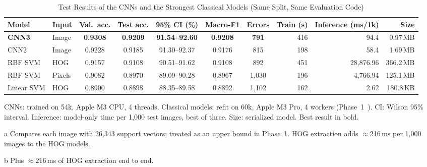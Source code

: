 \documentclass[conference]{IEEEtran}
\newcommand{\best}[1]{\textbf{#1}}
\begin{document}
\begin{table}[t]
  \centering
  \begin{threeparttable}
  \caption{Test Results of the CNNs and the Strongest Classical Models (Same Split, Same Evaluation Code)}
  \label{tab:test}
  \setlength{\tabcolsep}{5pt}
  \begin{tabular}{@{}l l c c c c c r r r@{}}
    \toprule
    Model & Input & Val.\ acc. & Test acc. & 95\% CI (\%) & Macro-F1 & Errors & Train (s) & Inference (ms/1k) & Size \\
    \midrule
    \best{CNN3} & Image & \best{0.9308} & \best{0.9209} & \best{91.54--92.60} & \best{0.9208} & \best{791} & 416 & 94.4 & 0.97\,MB \\
    CNN2        & Image & 0.9228 & 0.9185 & 91.30--92.37 & 0.9176 & 815 & 198 & 58.4 & 1.69\,MB \\
    \midrule
    RBF SVM     & HOG    & 0.9157 & 0.9108 & 90.51--91.62 & 0.9108 & 892   & 451 & 28{,}876.96\tnote{a} & 366.2\,MB \\
    RBF SVM     & Pixels & 0.9082 & 0.8970 & 89.09--90.28 & 0.8967 & 1{,}030 & 196 & 4{,}766.94 & 125.1\,MB \\
    Linear SVM  & HOG    & 0.8900 & 0.8898 & 88.35--89.58 & 0.8892 & 1{,}102 & 162 & 2.62\tnote{b} & 180.8\,KB \\
    \bottomrule
  \end{tabular}
  \begin{tablenotes}\footnotesize
    \item CNNs: trained on 54k, Apple M3 CPU, 4 threads. Classical models: refit on 60k, Apple M3 Pro, 4 workers
          (Phase~1~\cite{phase1report}). CI: Wilson 95\% interval. Inference: model-only time per 1{,}000 test images,
          best of three. Size: serialized model. Best result in bold.
    \item[a] Compares each image with 26{,}343 support vectors; treated as an upper bound in Phase~1. HOG extraction adds
          $\approx$216\,ms per 1{,}000 images to the HOG models.
    \item[b] Plus $\approx$216\,ms of HOG extraction end to end.
  \end{tablenotes}
  \end{threeparttable}
\end{table}
\end{document}

